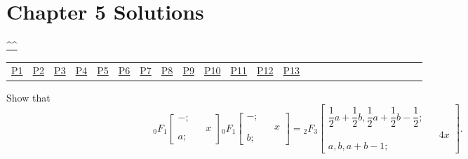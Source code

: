\section{Chapter 5 Solutions}
\begin{center}\hyperref[toc]{\^{}\^{}}\end{center}
\begin{center}\begin{tabular}{lllllllllllllllllllllllll}
\hyperref[problem1chapter5]{P1} & \hyperref[problem2chapter5]{P2} & \hyperref[problem3chapter5]{P3} & \hyperref[problem4chapter5]{P4} & \hyperref[problem5chapter5]{P5} & \hyperref[problem6chapter5]{P6} & \hyperref[problem7chapter5]{P7} & \hyperref[problem8chapter5]{P8} & \hyperref[problem9chapter5]{P9} & \hyperref[problem10chapter5]{P10} & \hyperref[problem11chapter5]{P11} & \hyperref[problem12chapter5]{P12} & \hyperref[problem13chapter5]{P13} 
\end{tabular}\end{center}
\setcounter{problem}{0}
\setcounter{solution}{0}
\begin{problem}\label{problem1chapter5}
Show that 
$$_0F_1 \left[ \begin{array}{rlr}
-; & & \\
& & x \\
a; & &
\end{array} \right] {}_0F_1 \left[ \begin{array}{rlr}
-; & & \\
& & x \\
b; & &
\end{array} \right] = {}_2F_3 \left[ \begin{array}{rlr}
\dfrac{1}{2}a + \dfrac{1}{2}b, \dfrac{1}{2}a + \dfrac{1}{2}b - \dfrac{1}{2}; & & \\
& & 4x \\
a,b,a+b-1; & &
\end{array} \right].$$
\end{problem}
